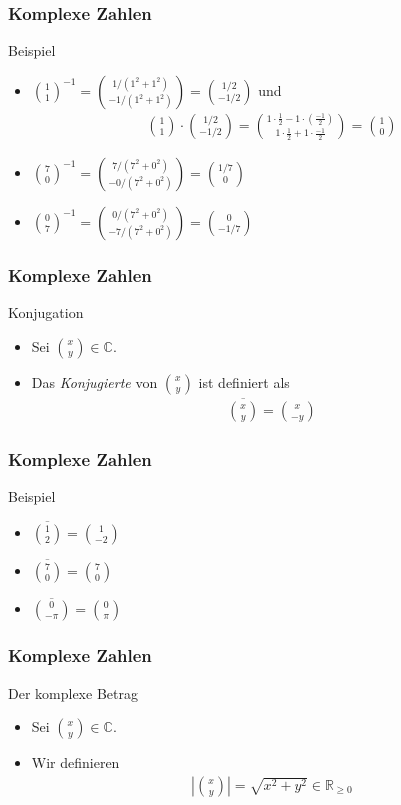 \documentclass{beamer}
\renewcommand{\emph}[1]{{\textcolor{solarizedRed}{\itshape #1}}}
\newcommand\RRpos{\mathbb R_{\geq0}}
\newcommand\CC{\mathbb C}
\newcommand{\abs}[1]{\left|#1\right|}
\newcommand\bc[1]{\left({#1}\right)}
\newcommand\bcfr[2]{\bc{\frac{#1}{#2}}}
\newcommand{\mytitle}{Komplexe Zahlen}
\begin{document}
\begin{frame}\frametitle{\mytitle}
	\begin{block}{Beispiel}
		\begin{itemize}
			\item $\binom11^{-1}=\binom{1/\bc{1^2+1^2}}{-1/\bc{1^2+1^2}}=\binom{1/2}{-1/2}$ und
				\begin{align*}
					\binom11\cdot\binom{1/2}{-1/2}=\binom{1\cdot\frac{1}{2}-1\cdot\bcfr{-1}2}{1\cdot\frac{1}{2}+1\cdot\frac{-1}{2}}=\binom10
				\end{align*}
			\item $\binom 70^{-1}=\binom{7/(7^2+0^2)}{-0/(7^2+0^2)}=\binom{1/7}0$
			\item $\binom 07^{-1}=\binom{0/(7^2+0^2)}{-7/(7^2+0^2)}=\binom0{-1/7}$
		\end{itemize}	
	\end{block}
\end{frame}

\begin{frame}\frametitle{\mytitle}
	\begin{block}{Konjugation}
		\begin{itemize}
			\item Sei $\binom xy\in\CC$.
			\item Das \emph{Konjugierte} von $\binom xy$ ist definiert als
				\begin{align*}
					\overline{\binom xy}=\binom x{-y}
				\end{align*}
		\end{itemize}	
	\end{block}
\end{frame}

\begin{frame}\frametitle{\mytitle}
	\begin{block}{Beispiel}
		\begin{itemize}
			\item $\overline{\binom12}=\binom1{-2}$
			\item $\overline{\binom70}=\binom70$
			\item $\overline{\binom0{-\pi}}=\binom0{\pi}$
		\end{itemize}	
	\end{block}
\end{frame}

\begin{frame}\frametitle{\mytitle}
	\begin{block}{Der komplexe Betrag}
		\begin{itemize}
			\item Sei $\binom xy\in\CC$.
			\item Wir definieren
				\begin{align*}
					\abs{\binom xy}=\sqrt{x^2+y^2}\in\RRpos
				\end{align*}
		\end{itemize}	
	\end{block}
\end{frame}
\end{document}
